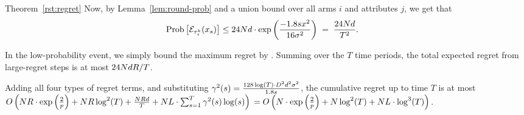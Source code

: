 \begin{emptyextraproof}{Theorem~\ref{rst:regret}}
Now, by Lemma~\ref{lem:round-prob} and a union bound over all arms $i$
and attributes $j$, we get that 
\begin{align*}
\Prob{\AccEU{\tau_s^k}{x_s}}
& \leq 24 \ARMNUM d \cdot \exp \left( \frac{-1.8 s x^2}{16 \sigma^2} \right)
\; = \; \frac{24 \ARMNUM d}{T^2}.
\end{align*}

In the low-probability event, we simply 
bound the maximum regret by \MAXR.
Summing over the $T$ time periods,
the total expected regret from large-regret steps is at most
$24 N d R / T$.

Adding all four types of regret terms,
and substituting 
$\EarlyCut[2]{s} = \frac{128\log(T) \cdot \Diam^2 d^2 \sigma^2}{1.8 s}$,
the cumulative regret up to time $T$ is at most
$
O \left(\ARMNUM \MAXR \cdot \exp \left( \frac{2}{p} \right)
+ \ARMNUM \MAXR \log^2(T)
+ \frac{\ARMNUM \MAXR d}{T}
+ \ARMNUM \TieDensity \cdot \sum_{s=1}^{T} \EarlyCut[2]{s} \log(s) \right)\\
= 
O \left(\ARMNUM  \cdot \exp \left( \frac{2}{p} \right)
+ \ARMNUM \log^2(T) + \ARMNUM \TieDensity \cdot \log^3(T) \right)$.\QED
\end{emptyextraproof}
